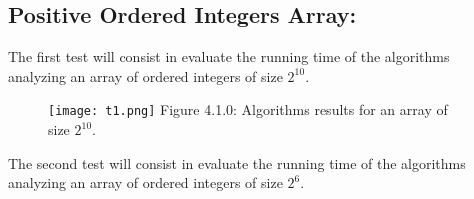 \subsection{Positive Ordered Integers Array:}

The first test will consist in evaluate the running time of the algorithms analyzing an array of ordered integers of size $2^{10}$. \hfill \break

{\bfseries\itshape\color{carmine}{Observation:}} {\itshape{}} \hfill \break

\begin{figure}[H]
\texttt{[image: t1.png]}
\centering \linebreak \linebreak Figure 4.1.0: Algorithms results for an array of size $2^{10}$.
\end{figure}

The second test will consist in evaluate the running time of the algorithms analyzing an array of ordered integers of size $2^{6}$. \hfill \break
